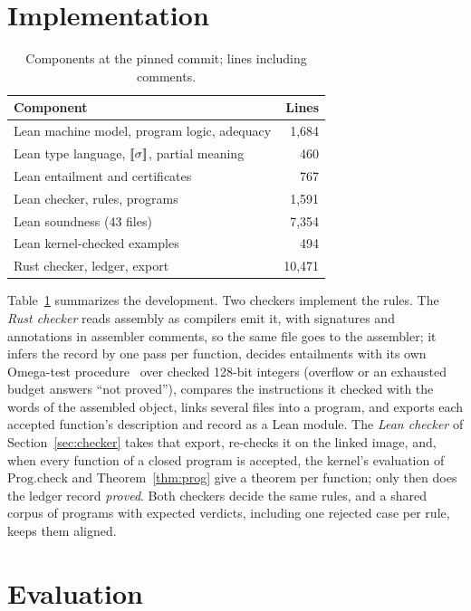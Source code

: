\section{Implementation}\label{sec:impl}
\begin{table}[t]
\caption{Components at the pinned commit; lines including comments.}
\label{tab:components}
\centering\small
\begin{tabular}{@{}lr@{}}
\toprule
Component & Lines\\
\midrule
Lean machine model, program logic, adequacy & 1,684\\
Lean type language, $[\![\sigma]\!]$, partial meaning & 460\\
Lean entailment and certificates & 767\\
Lean checker, rules, programs & 1,591\\
Lean soundness (43 files) & 7,354\\
Lean kernel-checked examples & 494\\
Rust checker, ledger, export & 10,471\\
\bottomrule
\end{tabular}
\end{table}

Table~\ref{tab:components} summarizes the development. Two checkers implement the rules. The \emph{Rust checker} reads assembly as compilers emit it, with signatures and annotations in assembler comments, so the same file goes to the assembler; it infers the record by one pass per function, decides entailments with its own Omega-test procedure~\cite{omega} over checked 128-bit integers (overflow or an exhausted budget answers ``not proved''), compares the instructions it checked with the words of the assembled object, links several files into a program, and exports each accepted function's description and record as a Lean module. The \emph{Lean checker} of Section~\ref{sec:checker} takes that export, re-checks it on the linked image, and, when every function of a closed program is accepted, the kernel's evaluation of $\mathrm{Prog.check}$ and Theorem~\ref{thm:prog} give a theorem per function; only then does the ledger record \emph{proved}. Both checkers decide the same rules, and a shared corpus of programs with expected verdicts, including one rejected case per rule, keeps them aligned.

\section{Evaluation}\label{sec:eval}
